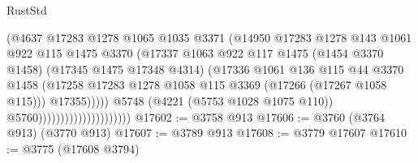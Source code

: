 \begin{lexlean}{RustStd}
\begin{coremodule}
{\begin{coremodule}
{{{{{{{{{{{{{{{{{{{{{{{{{{{{{{{                                                (@4637
                                                  @17283
                                                  @1278
                                                  @1065
                                                  @1035
                                                  @3371
                                                  (@14950
                                                    @17283
                                                    @1278
                                                    @143
                                                    @1061
                                                    @922
                                                    @115
                                                    @1475
                                                    @3370
                                                    (@17337
                                                      @1063
                                                      @922
                                                      @117
                                                      @1475
                                                      (@1454 @3370 @1458)
                                                      (@17345 @1475 @17348 @4314)
                                                      (@17336
                                                        @1061
                                                        @136
                                                        @115
                                                        @44
                                                        @3370
                                                        @1458
                                                        (@17258
                                                          @17283
                                                          @1278
                                                          @1058
                                                          @115
                                                          @3369
                                                          (@17266 (@17267 @1058 @115)))
                                                        @17355)))))
                                              @5748
                                              (@4221 (@5753 @1028 @1075 @110))
                                              @5760)))))))))))))))))))))
@17602 := @3758 @913
@17606 := @3760 (@3764 @913) (@3770 @913)
@17607 := @3789 @913
@17608 := @3779 @17607
@17610 := @3775 (@17608 @3794)
}}}}}}}}}}}}}}}}}}}}}}}}}}}}}}}
\end{coremodule}}
\end{coremodule}
\end{lexlean}
